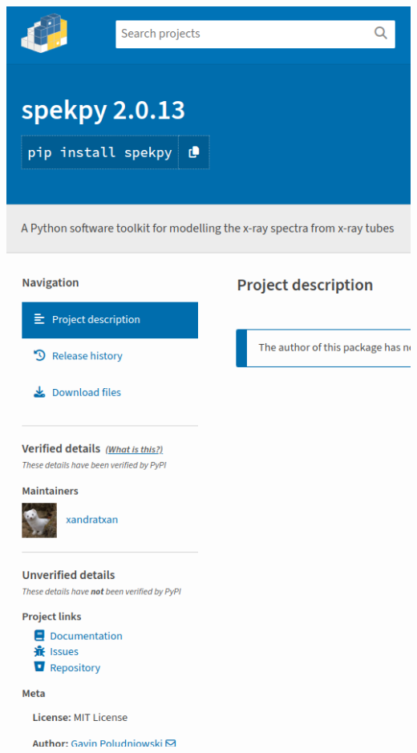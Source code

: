 \documentclass{beamer}
\begin{document}
\begin{frame}
\begin{columns}[T]
\begin{column}{0.4\textwidth}
				\includegraphics[width=\textwidth]{GRP_spekpy}
			\end{column}
		\end{columns}
	\end{frame}
	
\end{document}
